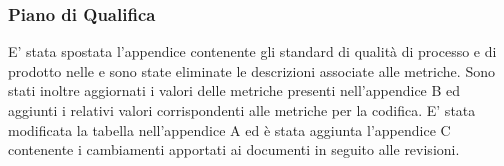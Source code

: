 	\subsubsection*{Piano di Qualifica}
	E' stata spostata l’appendice contenente gli standard di qualità di processo e di prodotto nelle \NdP{} e sono state eliminate le descrizioni associate alle metriche. Sono stati inoltre aggiornati i valori delle metriche presenti nell’appendice B ed aggiunti i relativi valori corrispondenti alle metriche per la codifica. E' stata modificata la tabella nell’appendice A ed è stata aggiunta l'appendice C contenente i cambiamenti apportati ai documenti in seguito alle revisioni.